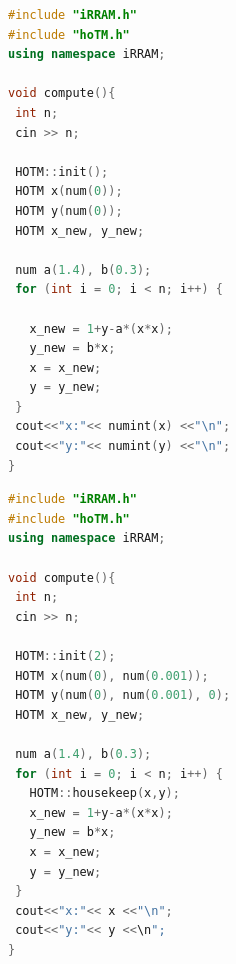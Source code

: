  \begin{minipage}{.5\textwidth}
    \begin{lstlisting}[language=C++, style=cpp, caption={[Implementierung der H\e non-Iteration in HOTM mit Intervallen,] \\Implementierung mit Punktintervallen },label=list:point]
#include "iRRAM.h"
#include "hoTM.h"
using namespace iRRAM;

void compute(){
 int n;
 cin >> n;
 
 HOTM::init();
 HOTM x(num(0));
 HOTM y(num(0));
 HOTM x_new, y_new;
 
 num a(1.4), b(0.3);
 for (int i = 0; i < n; i++) {
 
   x_new = 1+y-a*(x*x);
   y_new = b*x;
   x = x_new;
   y = y_new;
 }
 cout<<"x:"<< numint(x) <<"\n";
 cout<<"y:"<< numint(y) <<"\n";
}
\end{lstlisting}
 \end{minipage}
 \begin{minipage}{.5\textwidth}
    \begin{lstlisting}[language=C++,  style=cpp, caption={[Implementierung der H\e non-Iteration in HOTM mit Intervallen] \\Implementierung mit Intervallen }, label=list:int]  
#include "iRRAM.h"
#include "hoTM.h"
using namespace iRRAM;

void compute(){
 int n;
 cin >> n;
 
 HOTM::init(2);
 HOTM x(num(0), num(0.001));
 HOTM y(num(0), num(0.001), 0);
 HOTM x_new, y_new;
 
 num a(1.4), b(0.3);
 for (int i = 0; i < n; i++) {
   HOTM::housekeep(x,y);
   x_new = 1+y-a*(x*x);
   y_new = b*x;
   x = x_new;
   y = y_new;
 }
 cout<<"x:"<< x <<"\n";
 cout<<"y:"<< y <<\n";
}
\end{lstlisting}
 \end{minipage}

 
 


